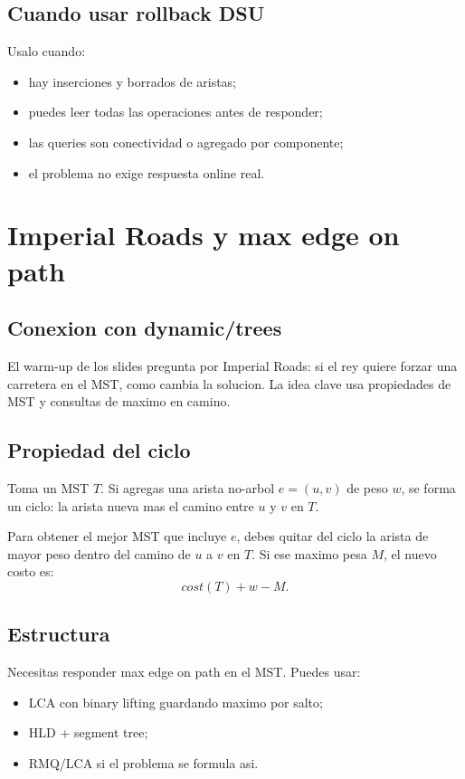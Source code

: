 \documentclass[10pt]{article}
\begin{document}
\subsection{Cuando usar rollback DSU}
Usalo cuando:
\begin{itemize}[leftmargin=*]
\item hay inserciones y borrados de aristas;
\item puedes leer todas las operaciones antes de responder;
\item las queries son conectividad o agregado por componente;
\item el problema no exige respuesta online real.
\end{itemize}

\newpage
\section{Imperial Roads y max edge on path}

\subsection{Conexion con dynamic/trees}
El warm-up de los slides pregunta por Imperial Roads: si el rey quiere forzar
una carretera en el MST, como cambia la solucion. La idea clave usa propiedades
de MST y consultas de maximo en camino.

\subsection{Propiedad del ciclo}
Toma un MST $T$. Si agregas una arista no-arbol $e=(u,v)$ de peso $w$, se forma
un ciclo: la arista nueva mas el camino entre $u$ y $v$ en $T$.

Para obtener el mejor MST que incluye $e$, debes quitar del ciclo la arista de
mayor peso dentro del camino de $u$ a $v$ en $T$. Si ese maximo pesa $M$, el
nuevo costo es:
\[
cost(T)+w-M.
\]

\subsection{Estructura}
Necesitas responder max edge on path en el MST. Puedes usar:
\begin{itemize}[leftmargin=*]
\item LCA con binary lifting guardando maximo por salto;
\item HLD + segment tree;
\item RMQ/LCA si el problema se formula asi.
\end{itemize}
\end{document}
